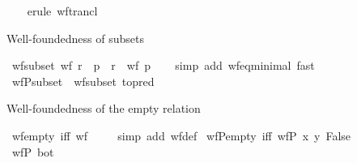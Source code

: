 \begin{isabellebody}
\ \ \isamarkupfalse%
\ {\isacharparenleft}{\kern0pt}erule\ wf{\isacharunderscore}{\kern0pt}trancl{\isacharparenright}{\kern0pt}\isanewline
\ \ \isamarkupfalse%
%
\endisatagproof
{\isafoldproof}%
%
\isadelimproof
%
\endisadelimproof
%
\begin{isamarkuptext}%
Well-foundedness of subsets%
\end{isamarkuptext}\isamarkuptrue%
\isamarkupfalse%
\ wf{\isacharunderscore}{\kern0pt}subset{\isacharcolon}{\kern0pt}\ {\isachardoublequoteopen}wf\ r\ {\isasymLongrightarrow}\ p\ {\isasymsubseteq}\ r\ {\isasymLongrightarrow}\ wf\ p{\isachardoublequoteclose}\isanewline
%
\isadelimproof
\ \ %
\endisadelimproof
%
\isatagproof
{}\isamarkupfalse%
\ {\isacharparenleft}{\kern0pt}simp\ add{\isacharcolon}{\kern0pt}\ wf{\isacharunderscore}{\kern0pt}eq{\isacharunderscore}{\kern0pt}minimal{\isacharparenright}{\kern0pt}\ fast%
\endisatagproof
{\isafoldproof}%
%
\isadelimproof
\isanewline
%
\endisadelimproof
\isanewline
{}\isamarkupfalse%
\ wfP{\isacharunderscore}{\kern0pt}subset\ {\isacharequal}{\kern0pt}\ wf{\isacharunderscore}{\kern0pt}subset\ {\isacharbrackleft}{\kern0pt}to{\isacharunderscore}{\kern0pt}pred{\isacharbrackright}{\kern0pt}%
\begin{isamarkuptext}%
Well-foundedness of the empty relation%
\end{isamarkuptext}\isamarkuptrue%
\isamarkupfalse%
\ wf{\isacharunderscore}{\kern0pt}empty\ {\isacharbrackleft}{\kern0pt}iff{\isacharbrackright}{\kern0pt}{\isacharcolon}{\kern0pt}\ {\isachardoublequoteopen}wf\ {\isacharbraceleft}{\kern0pt}{\isacharbraceright}{\kern0pt}{\isachardoublequoteclose}\isanewline
%
\isadelimproof
\ \ %
\endisadelimproof
%
\isatagproof
{}\isamarkupfalse%
\ {\isacharparenleft}{\kern0pt}simp\ add{\isacharcolon}{\kern0pt}\ wf{\isacharunderscore}{\kern0pt}def{\isacharparenright}{\kern0pt}%
\endisatagproof
{\isafoldproof}%
%
\isadelimproof
\isanewline
%
\endisadelimproof
\isanewline
{}\isamarkupfalse%
\ wfP{\isacharunderscore}{\kern0pt}empty\ {\isacharbrackleft}{\kern0pt}iff{\isacharbrackright}{\kern0pt}{\isacharcolon}{\kern0pt}\ {\isachardoublequoteopen}wfP\ {\isacharparenleft}{\kern0pt}{\isasymlambda}x\ y{\isachardot}{\kern0pt}\ False{\isacharparenright}{\kern0pt}{\isachardoublequoteclose}\isanewline
%
\isadelimproof
%
\endisadelimproof
%
\isatagproof
{}\isamarkupfalse%
\ {\isacharminus}{\kern0pt}\isanewline
\ \ \isamarkupfalse%
\ {\isachardoublequoteopen}wfP\ bot{\isachardoublequoteclose}\isanewline

\end{isabellebody}
